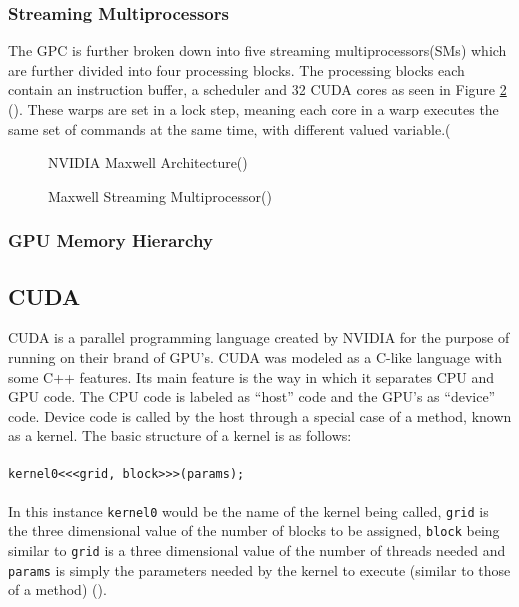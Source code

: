 \subsubsection{Streaming Multiprocessors}\label{gpu:ssec:smm}
The GPC is further broken down into five streaming multiprocessors(SMs) which are further divided into four processing blocks. The processing blocks each contain an instruction buffer, a scheduler and 32 CUDA cores as seen in Figure \ref{gpu:img:smm} (\cite{GM107SMM}). These warps are set in a lock step, meaning each core in a warp executes the same set of commands at the same time, with different valued variable.(\cite{CUDA_DEVKIT}
%
\begin{figure}[H]
 \centering
 \caption{NVIDIA Maxwell Architecture(\cite{GM107})}
 \label{gpu:img:gm107}
\end{figure}
%
\begin{figure}[H]
\centering
 \caption{Maxwell Streaming Multiprocessor(\cite{GM107SMM})}
 \label{gpu:img:smm}
\end{figure}
%
\subsubsection{GPU Memory Hierarchy}

\subsection{CUDA}\label{soft:sec:cuda}
CUDA is a parallel programming language created by NVIDIA for the purpose of running on their brand of GPU's. CUDA was modeled as a C-like language with some C++ features. Its main feature is the way in which it separates CPU and GPU code. The CPU code is labeled as ``host'' code and the GPU's as ``device'' code. Device code is called by the host through a special case of a method, known as a kernel. The basic structure of a kernel is as follows: 
\\
\\
\texttt{kernel0<<<grid, block>>>(params);}
\\
\\
In this instance \texttt{kernel0} would be the name of the kernel being called, \texttt{grid} is the three dimensional value of the number of blocks to be assigned, \texttt{block} being similar to \texttt{grid} is a three dimensional value of the number of threads needed and \texttt{params} is simply the parameters needed by the kernel to execute (similar to those of a method) (\cite{CUDA_DEVKIT}).
%
